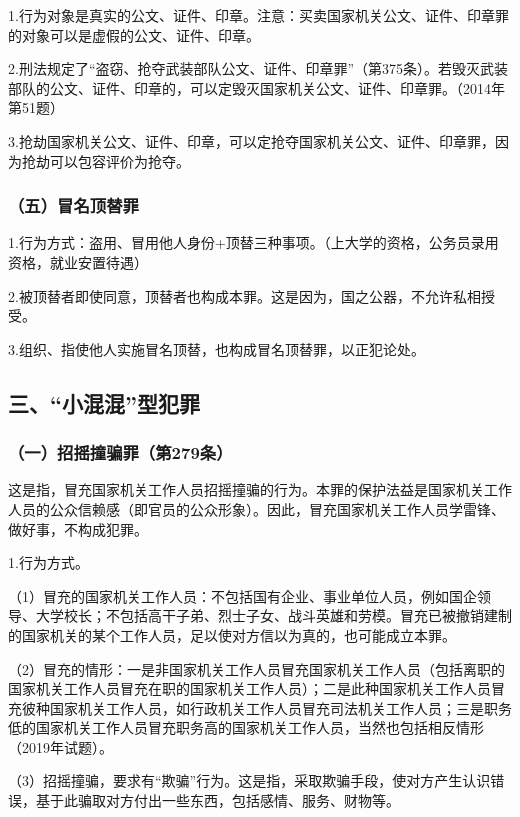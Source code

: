 1.行为对象是真实的公文、证件、印章。注意：买卖国家机关公文、证件、印章罪的对象可以是虚假的公文、证件、印章。

2.刑法规定了“盗窃、抢夺武装部队公文、证件、印章罪”（第375条）。若毁灭武装部队的公文、证件、印章的，可以定毁灭国家机关公文、证件、印章罪。（2014年第51题）

3.抢劫国家机关公文、证件、印章，可以定抢夺国家机关公文、证件、印章罪，因为抢劫可以包容评价为抢夺。

\subsubsection*{（五）冒名顶替罪}

1.行为方式：盗用、冒用他人身份+顶替三种事项。（上大学的资格，公务员录用资格，就业安置待遇）

2.被顶替者即使同意，顶替者也构成本罪。这是因为，国之公器，不允许私相授受。

3.组织、指使他人实施冒名顶替，也构成冒名顶替罪，以正犯论处。

\subsection*{三、“小混混”型犯罪}

\subsubsection*{（一）招摇撞骗罪（第279条）}

这是指，冒充国家机关工作人员招摇撞骗的行为。本罪的保护法益是国家机关工作人员的公众信赖感（即官员的公众形象）。因此，冒充国家机关工作人员学雷锋、做好事，不构成犯罪。

1.行为方式。

（1）冒充的国家机关工作人员：不包括国有企业、事业单位人员，例如国企领导、大学校长；不包括高干子弟、烈士子女、战斗英雄和劳模。冒充已被撤销建制的国家机关的某个工作人员，足以使对方信以为真的，也可能成立本罪。

（2）冒充的情形：一是非国家机关工作人员冒充国家机关工作人员（包括离职的国家机关工作人员冒充在职的国家机关工作人员）；二是此种国家机关工作人员冒充彼种国家机关工作人员，如行政机关工作人员冒充司法机关工作人员；三是职务低的国家机关工作人员冒充职务高的国家机关工作人员，当然也包括相反情形（2019年试题）。

（3）招摇撞骗，要求有“欺骗”行为。这是指，采取欺骗手段，使对方产生认识错误，基于此骗取对方付出一些东西，包括感情、服务、财物等。

